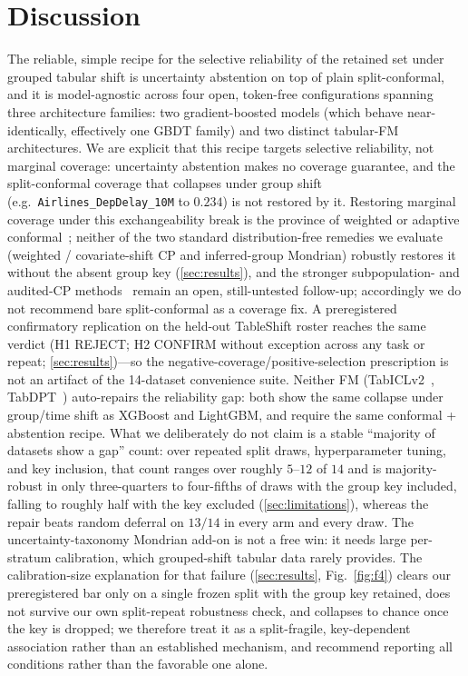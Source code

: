 \documentclass[11pt]{article}
\begin{document}
\section{Discussion}\label{sec:discussion}
The reliable, simple recipe for the selective reliability of the retained set under grouped tabular
shift is uncertainty abstention on top of plain split-conformal, and it is model-agnostic across four
open, token-free configurations spanning three architecture families: two
gradient-boosted models (which behave near-identically, effectively one GBDT family)
and two distinct tabular-FM architectures. We are explicit that this recipe targets selective
reliability, not marginal coverage: uncertainty abstention makes no coverage guarantee, and the split-conformal
coverage that collapses under group shift (e.g.\ \texttt{Airlines\_DepDelay\_10M} to $0.234$) is not
restored by it. Restoring marginal coverage under this exchangeability break is the province of weighted or
adaptive conformal~\citep{tibshirani2019covariate,barber2023beyond}; neither of the two standard
distribution-free remedies we evaluate (weighted / covariate-shift CP and inferred-group Mondrian) robustly
restores it without the absent group key (\cref{sec:results}), and the stronger subpopulation- and
audited-CP methods~\citep{subpop2025conformal,audited2026conformal} remain an open, still-untested
follow-up; accordingly we do not recommend bare split-conformal as a coverage fix. A preregistered
confirmatory replication on the held-out TableShift roster reaches the same verdict (H1 REJECT; H2 CONFIRM
without exception across any task or repeat; \cref{sec:results})---so the negative-coverage/positive-selection
prescription is not an artifact of the 14-dataset convenience suite.
Neither FM (TabICLv2~\citep{qu2026tabicl},
TabDPT~\citep{ma2024tabdpt}) auto-repairs the reliability gap: both show the same collapse under group/time
shift as XGBoost and LightGBM, and require the same conformal + abstention recipe. What we deliberately do
not claim is a stable ``majority of datasets show a gap'' count: over repeated split draws, hyperparameter
tuning, and key inclusion, that count ranges over roughly $5$--$12$ of $14$ and is majority-robust in only
three-quarters to four-fifths of draws with the group key included, falling to roughly half with the key
excluded (\cref{sec:limitations}), whereas the repair beats random deferral on $13/14$ in every arm and
every draw. The uncertainty-taxonomy Mondrian add-on is not a free win: it needs large per-stratum calibration,
which grouped-shift tabular data rarely provides.
The calibration-size explanation for that failure (\cref{sec:results}, Fig.~\ref{fig:f4}) clears our
preregistered bar only on a single frozen split with the group key retained, does not survive our own
split-repeat robustness check, and collapses to chance once the key is dropped; we therefore treat it as a
split-fragile, key-dependent association rather than an established mechanism, and recommend reporting all
conditions rather than the favorable one alone.
\end{document}

